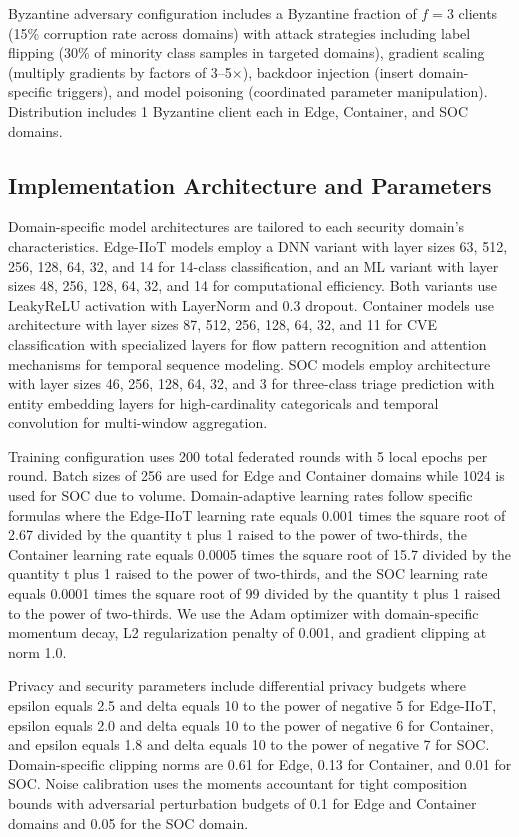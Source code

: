 \documentclass[12pt,a4paper]{article}
\theoremstyle{definition}
\begin{document}
Byzantine adversary configuration includes a Byzantine fraction of $f = 3$ clients (15\% corruption rate across domains) with attack strategies including label flipping (30\% of minority class samples in targeted domains), gradient scaling (multiply gradients by factors of 3--5$\times$), backdoor injection (insert domain-specific triggers), and model poisoning (coordinated parameter manipulation). Distribution includes 1 Byzantine client each in Edge, Container, and SOC domains.

\subsection{Implementation Architecture and Parameters}

Domain-specific model architectures are tailored to each security domain's characteristics. Edge-IIoT models employ a DNN variant with layer sizes 63, 512, 256, 128, 64, 32, and 14 for 14-class classification, and an ML variant with layer sizes 48, 256, 128, 64, 32, and 14 for computational efficiency. Both variants use LeakyReLU activation with LayerNorm and 0.3 dropout. Container models use architecture with layer sizes 87, 512, 256, 128, 64, 32, and 11 for CVE classification with specialized layers for flow pattern recognition and attention mechanisms for temporal sequence modeling. SOC models employ architecture with layer sizes 46, 256, 128, 64, 32, and 3 for three-class triage prediction with entity embedding layers for high-cardinality categoricals and temporal convolution for multi-window aggregation.

Training configuration uses 200 total federated rounds with 5 local epochs per round. Batch sizes of 256 are used for Edge and Container domains while 1024 is used for SOC due to volume. Domain-adaptive learning rates follow specific formulas where the Edge-IIoT learning rate equals 0.001 times the square root of 2.67 divided by the quantity t plus 1 raised to the power of two-thirds, the Container learning rate equals 0.0005 times the square root of 15.7 divided by the quantity t plus 1 raised to the power of two-thirds, and the SOC learning rate equals 0.0001 times the square root of 99 divided by the quantity t plus 1 raised to the power of two-thirds. We use the Adam optimizer with domain-specific momentum decay, L2 regularization penalty of 0.001, and gradient clipping at norm 1.0.

Privacy and security parameters include differential privacy budgets where epsilon equals 2.5 and delta equals 10 to the power of negative 5 for Edge-IIoT, epsilon equals 2.0 and delta equals 10 to the power of negative 6 for Container, and epsilon equals 1.8 and delta equals 10 to the power of negative 7 for SOC. Domain-specific clipping norms are 0.61 for Edge, 0.13 for Container, and 0.01 for SOC. Noise calibration uses the moments accountant for tight composition bounds with adversarial perturbation budgets of 0.1 for Edge and Container domains and 0.05 for the SOC domain.
\end{document}
